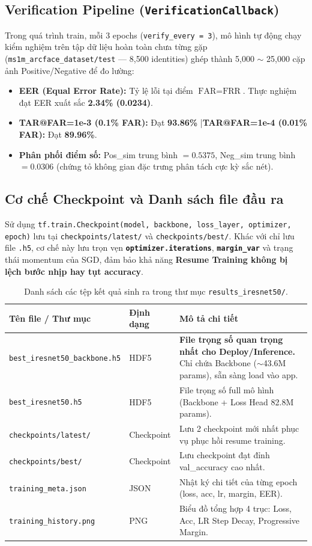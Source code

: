 \documentclass[11pt,a4paper]{article}
\begin{document}
\subsection{Verification Pipeline (\texttt{VerificationCallback})}
Trong quá trình train, mỗi 3 epochs (\texttt{verify\_every = 3}), mô hình tự động chạy kiểm nghiệm trên tập dữ liệu hoàn toàn chưa từng gặp (\texttt{ms1m\_arcface\_dataset/test} --- 8,500 identities) ghép thành 5,000 $\sim$ 25,000 cặp ảnh Positive/Negative để đo lường:
\begin{itemize}
    \item \textbf{EER (Equal Error Rate):} Tỷ lệ lỗi tại điểm $\text{FAR} = \text{FRR}$. Thực nghiệm đạt EER xuất sắc \textbf{2.34\% (0.0234)}.
    \item \textbf{TAR@FAR=1e-3 (0.1\% FAR):} Đạt \textbf{93.86\%} \quad|\quad \textbf{TAR@FAR=1e-4 (0.01\% FAR):} Đạt \textbf{89.96\%}.
    \item \textbf{Phân phối điểm số:} Pos\_sim trung bình $= 0.5375$, Neg\_sim trung bình $= 0.0306$ (chứng tỏ không gian đặc trưng phân tách cực kỳ sắc nét).
\end{itemize}

\subsection{Cơ chế Checkpoint và Danh sách file đầu ra}
Sử dụng \texttt{tf.train.Checkpoint(model, backbone, loss\_layer, optimizer, epoch)} lưu tại \texttt{checkpoints/latest/} và \texttt{checkpoints/best/}. Khác với chỉ lưu file \texttt{.h5}, cơ chế này lưu trọn vẹn \textbf{\texttt{optimizer.iterations}}, \textbf{\texttt{margin\_var}} và trạng thái momentum của SGD, đảm bảo khả năng \textbf{Resume Training không bị lệch bước nhịp hay tụt accuracy}.

\begin{table}[H]
\centering
\begin{tabular}{l l p{8cm}}
\toprule
\textbf{Tên file / Thư mục} & \textbf{Định dạng} & \textbf{Mô tả chi tiết} \\
\midrule
\texttt{best\_iresnet50\_backbone.h5} & HDF5 & \textbf{File trọng số quan trọng nhất cho Deploy/Inference.} Chỉ chứa Backbone ($\sim$43.6M params), sẵn sàng load vào app. \\
\texttt{best\_iresnet50.h5} & HDF5 & File trọng số full mô hình (Backbone + Loss Head 82.8M params). \\
\texttt{checkpoints/latest/} & Checkpoint & Lưu 2 checkpoint mới nhất phục vụ phục hồi resume training. \\
\texttt{checkpoints/best/} & Checkpoint & Lưu checkpoint đạt đỉnh val\_accuracy cao nhất. \\
\texttt{training\_meta.json} & JSON & Nhật ký chi tiết của từng epoch (loss, acc, lr, margin, EER). \\
\texttt{training\_history.png} & PNG & Biểu đồ tổng hợp 4 trục: Loss, Acc, LR Step Decay, Progressive Margin. \\
\bottomrule
\end{tabular}
\caption{Danh sách các tệp kết quả sinh ra trong thư mục \texttt{results\_iresnet50/}.}
\end{table}
\end{document}
